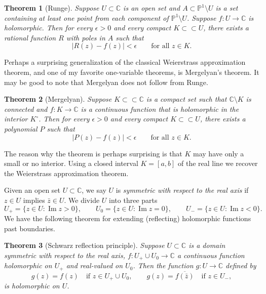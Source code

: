 \documentclass[12pt,openany]{book}
\renewcommand{\Im}{\operatorname{Im}}
\newcommand{\sabs}[1]{\lvert {#1} \rvert}
\newcommand{\C}{{\mathbb{C}}}
\newcommand{\bP}{{\mathbb{P}}}
\newcommand{\myindex}[1]{#1\index{#1}}
\theoremstyle{plain}
\newtheorem{thm}{Theorem}[section]
\theoremstyle{remark}
\theoremstyle{definition}
\theoremstyle{exercise}
\theoremstyle{example}
\begin{document}
\begin{thm}[Runge]
Suppose $U \subset \C$ is an open set and $A \subset \bP^1 \setminus U$
is a set containing at least one point from each component of
$\bP^1 \setminus U$.  Suppose $f \colon U \to \C$ is holomorphic.
Then for every $\epsilon > 0$ and every compact
$K \subset \subset U$, there exists a rational function $R$ with poles in $A$
such that
\begin{equation*}
\sabs{R(z) - f(z)} < \epsilon \qquad \text{for all $z \in K$}.
\end{equation*}
\end{thm}

Perhaps a surprising generalization of the
classical Weierstrass approximation theorem,
and one of my favorite one-variable theorems,
is Mergelyan's theorem.
It may be good to note that Mergelyan does not follow from Runge.

\begin{thm}[Mergelyan] \label{thm:mergelyan}
Suppose $K \subset \subset \C$ is a compact set such that $\C \setminus K$
is connected and
$f \colon K \to \C$ is a continuous function that is
holomorphic in the interior $K^\circ$.
Then for every $\epsilon > 0$ and every compact
$K \subset \subset U$, there exists a polynomial $P$
such that
\begin{equation*}
\sabs{P(z) - f(z)} < \epsilon \qquad \text{for all $z \in K$}.
\end{equation*}
\end{thm}

The reason why the theorem is perhaps
surprising is that $K$ may have only a
small or no interior.  Using a closed interval $K=[a,b]$ of the real line we
recover the Weierstrass approximation theorem.

\medskip

Given an open set $U \subset \C$, we say $U$ is
\emph{\myindex{symmetric with respect to the real axis}} if
$z \in U$ implies $\bar{z} \in U$.  We divide $U$ into
three parts
\begin{equation*}
U_+ = \{ z \in U : \Im z > 0 \}, \qquad
U_0 = \{ z \in U : \Im z = 0 \}, \qquad
U_- = \{ z \in U : \Im z < 0 \}.
\end{equation*}
We have the following theorem for extending (reflecting) holomorphic functions past
boundaries.

\begin{thm}[Schwarz reflection principle]
%
Suppose $U \subset \C$ is a domain symmetric with respect to the real axis,
$f \colon U_+ \cup U_0 \to \C$ a continuous function holomorphic on $U_+$
and real-valued on $U_0$.  Then the function $g \colon U \to \C$
defined by
\begin{equation*}
g(z) = f(z) \quad \text{if $z \in U_+ \cup U_0$},
\qquad
g(z) =
\overline{f(\bar{z})} \quad \text{if $z \in U_-$},
\end{equation*}
is holomorphic on $U$.
\end{thm}
\end{document}
